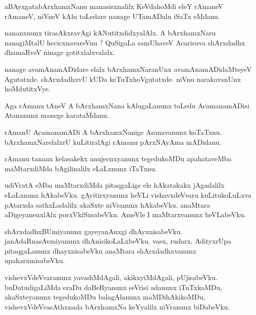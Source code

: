 \documentclass{article}
\begin{document}
\begin{mn}
aBAyxgatabArxhamxNanu  manasisxnalilx  KeVdahoMdi  eleY  rAmaneV  rAmaneV,  niVneV  kAlu  toLedare  nanage  UTamADalu  iSaTx  eMdanu.
\end{mn}

\begin{mn}
nananxnunx  tirasAkxravAgi  kANutitxdidxyalAlx.  A  bArxhamxNaru  nanagiMtalU  hecicxnavareVnu ?  QuSigaLa  samUhaveV  
Acarisuva  shArxdadhx  dhamaRveV  ninage  gotitxlalxvalalx.
\end{mn}

\begin{mn}
nanage  avamAnamADidare  elalx  bArxhamxNaranUnx  avamAnamADidaMteyeV  Agutatxde.  shArxdadhxvU  kUDa  keTuTxhoVgutatxde.  
niVnu  narakavanUnx  hoMdutitxVye.
\end{mn}

\begin{mn}
Aga  rAmanu  tAneV  A  bArxhamxNana  kAlugaLanunx  toLedu  AcamanamADisi  Atananunx  manege  karataMdanu.
\end{mn}

\begin{mn}
rAmanU  AcamanamADi  A  bArxhamxNanige  Asanavanunx  koTaTxnu.  bArxhamxNarelalxrU  kuLitiralAgi  rAmanu  pArxNAyAma  mADidanu.
\end{mn}

\begin{mn}
rAmanu  tananx  kelasakekx  anujecnxyanunx  tegedukoMDu  apahataveMba  maMtarxdiMda  bAgilinalilx  eLaLxnunx  iTaTxnu.
\end{mn}

\begin{mn}
udiVratA  eMba  maMtarxdiMda pitaqgaLige  ele  hAkatakakx  jAgadalilx  eLaLxnunx  hAkabeVku.  gAyitirxyanunx  heVLi  
vishavxdeVvaru  kuLitukoLuLxva  pAtarxda  sathxLadalilx  akaSxte  niVranunx  hAkabeVku.  anaMtara  aDigeyanenxlAlx  
porxVkiSxsabeVku.  AmeVle  I  maMtarxvanunx  heVLabeVku.
\end{mn}

\begin{mn}
shArxdadhxBUmiyanunx  gayeyanAnxgi  dhAyxnisabeVku.  janAdaRnasAvmiyanunx  dhAnisikoLaLxbeVku.  vasu,  rudarx,  AdityxrUpa  
pitaqgaLanunx  dhayxnisabeVku anaMtara  shArxdadhxvanunx  upakarxmisabeVku.  
\end{mn}

\begin{mn}
vishevxVdeVvaranunx  yavadiMdAgali,  akikxyiMdAgali,  pUjisabeVku.  buDatudigaLiMda  eraDu  daBeRyanunx  seVrisi  adanunx  iTuTxkoMDu,  
akaSxteyanunx tegedukoMDu  balagAlanunx  maMDihAkikoMDu,  vishevxVdeVvasAthxnada  bArxhamxNa  keYyalilx  niVranunx  biDabeVku.
\end{mn}
\end{document}
